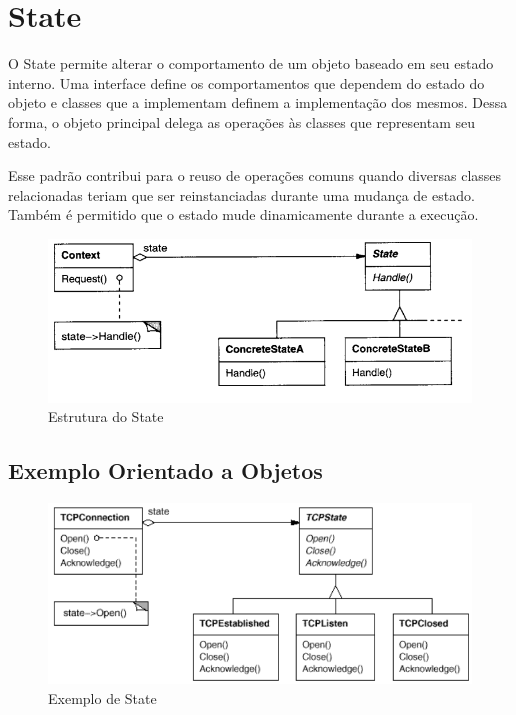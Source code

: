 \section{State}

O State permite alterar o comportamento de um objeto baseado 
em seu estado interno. Uma interface define os comportamentos 
que dependem do estado do objeto e classes que a implementam 
definem a implementação dos mesmos. Dessa forma, o objeto 
principal delega as operações às classes que representam 
seu estado.

Esse padrão contribui para o reuso de operações comuns quando 
diversas classes relacionadas teriam que ser reinstanciadas 
durante uma mudança de estado. Também é permitido que o 
estado mude dinamicamente durante a execução.

\begin{figure}[htb]
	\caption{\label{state_struct}Estrutura do State}
	\begin{center}
	    \includegraphics[scale=0.5]{5_padroes-contexto-funcional/5.3_comportamentais/5.3.08_state/diagram.png}
	\end{center}
\end{figure}

\subsection*{Exemplo Orientado a Objetos}

\begin{figure}[htb]
	\caption{\label{state_exemplo}Exemplo de State}
	\begin{center}
	    \includegraphics[scale=0.5]{5_padroes-contexto-funcional/5.3_comportamentais/5.3.08_state/state_exemplo.png}
	\end{center}
\end{figure}

